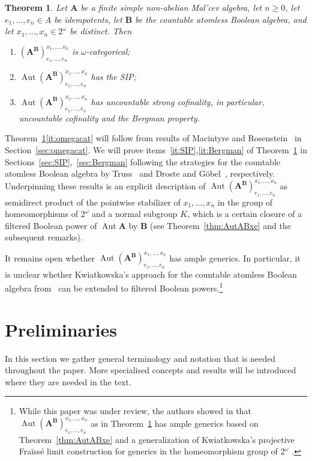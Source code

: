 \documentclass[12pt,a4paper,reqno]{amsart}
\numberwithin{equation}{section}
\theoremstyle{plain}
\newtheorem{thm}{Theorem}[section]
\theoremstyle{definition}
\newcommand{\A}{\mathbf{A}}
\newcommand{\ABxe}{(\mathbf{A^B})^{x_1,\dots,x_n}_{e_1,\dots,e_n}}
\newcommand{\B}{\mathbf{B}}
\DeclareMathOperator{\Aut}{Aut}
\begin{document}
\begin{thm} \label{thm:SIP}
 Let $\A$ be a finite simple non-abelian Mal'cev algebra, let $n\geq 0$, let $e_1,\dots,e_n\in A$ be idempotents,
 let $\B$ be the countable atomless Boolean algebra, and let $x_1,\dots,x_n\in 2^\omega$ be distinct. Then 
\begin{enumerate} 
\item \label{it:omegacat}
  $\ABxe$ is $\omega$-categorical;
\item \label{it:SIP}
$\Aut\ABxe$ has the SIP;
\item \label{it:Bergman}
 $\Aut\ABxe$ has uncountable strong cofinality, in particular, uncountable cofinality and the Bergman property.
\end{enumerate}  
\end{thm}

Theorem~\ref{thm:SIP}\eqref{it:omegacat} will follow from results of Macintyre and Rosenstein~\cite{MR:CRN}
 in Section~\ref{sec:omegacat}.
 We will prove items~\eqref{it:SIP},\eqref{it:Bergman} of Theorem~\ref{thm:SIP} in
 Sections~\ref{sec:SIP},~\ref{sec:Bergman} following the strategies for the countable atomless Boolean
 algebra by Truss~\cite{Tr:IPG2} and Droste and G\"obel~\cite{DG:UCPG}, respectively.
 Underpinning these results is an explicit description of $\Aut\ABxe$ as semidirect product of
 the pointwise stabilizer of $x_1,\dots,x_n$ in the group of homeomorphisms of $2^\omega$
and a normal subgroup $K$, which is a certain
 closure of a filtered Boolean power of $\Aut\A$ by $\B$
 (see Theorem~\ref{thm:AutABxe} and the subsequent remarks).
 
 It remains open whether $\Aut\ABxe$ has ample generics. In particular, it is unclear whether Kwiatkowska's
 approach for the countable atomless Boolean algebra from~\cite{Kw:GHC} can be extended to filtered Boolean powers.\footnote{While this paper was under review, the authors showed in \cite{MR:AGBP} that $\Aut\ABxe$ as in Theorem~\ref{thm:SIP} has ample generics based on Theorem~\ref{thm:AutABxe} and a generalization of Kwiatkowska's projective Fra{\"i}ss{\'e} limit construction for generics in the homeomorphism group of $2^\omega$ \cite{Kw:GHC}.}

 
 
 \section{Preliminaries} \label{sec:prelim}
 
 
 
 In this section we gather general terminology and notation that is needed throughout the paper. More specialised concepts and results will be introduced where they are needed in the text.
 
\end{document}
